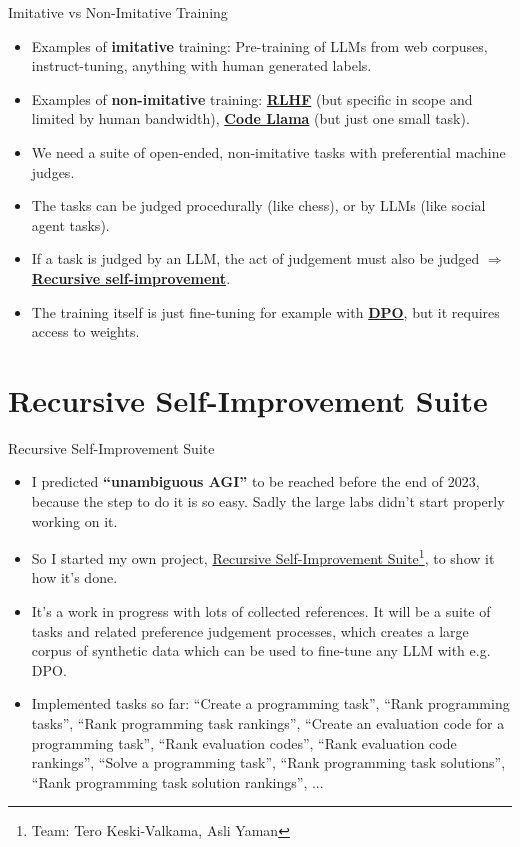 \documentclass{beamer}
\begin{document}
\begin{frame}{Imitative vs Non-Imitative Training}
  \begin{itemize}
   \item Examples of \textbf{imitative} training: Pre-training of LLMs from web corpuses, instruct-tuning, anything with human generated labels.
   \item Examples of \textbf{non-imitative} training: \textcolor{blue}{\href{https://arxiv.org/abs/1909.08593}{\textbf{RLHF}}} (but specific in scope and limited by human bandwidth), \textcolor{blue}{\href{https://about.fb.com/news/2023/08/code-llama-ai-for-coding/}{\textbf{Code Llama}}} (but just one small task).
   \item We need a suite of open-ended, non-imitative tasks with preferential machine judges.
   \item The tasks can be judged procedurally (like chess), or by LLMs (like social agent tasks).
   \item If a task is judged by an LLM, the act of judgement must also be judged $\Rightarrow$ \textcolor{blue}{\href{https://github.com/keskival/recursive-self-improvement-suite}{\textbf{Recursive self-improvement}}}.
   \item The training itself is just fine-tuning for example with \textcolor{blue}{\href{https://arxiv.org/abs/2305.18290}{\textbf{DPO}}}, but it requires access to weights.
  \end{itemize}

\end{frame}

\section{Recursive Self-Improvement Suite}
\begin{frame}{Recursive Self-Improvement Suite}
  \begin{itemize}
   \item I predicted \textbf{``unambiguous AGI''} to be reached before the end of 2023, because the step to do it is so easy. Sadly the large labs didn't start properly working on it.
   \item So I started my own project, \textcolor{blue}{\href{https://github.com/keskival/recursive-self-improvement-suite}{Recursive Self-Improvement Suite}}\footnote{Team: Tero Keski-Valkama, Asli Yaman}, to show it how it's done.
   \item It's a work in progress with lots of collected references. It will be a suite of tasks and related preference judgement processes, which creates a large corpus of synthetic data which can be used to fine-tune any LLM with e.g. DPO.
   \item Implemented tasks so far: ``Create a programming task'', ``Rank programming tasks'', ``Rank programming task rankings'', ``Create an evaluation code for a programming task'', ``Rank evaluation codes'', ``Rank evaluation code rankings'', ``Solve a programming task'', ``Rank programming task solutions'', ``Rank programming task solution rankings'', ...
  \end{itemize}
\end{frame}
\end{document}
